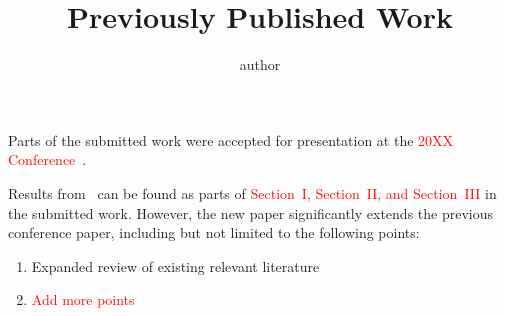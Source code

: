 \documentclass[letterpaper,DIV=11,english,parskip=half]{scrartcl}
\title{Previously Published Work}
\author{{{author}}}
\begin{document}
\maketitle

Parts of the submitted work were accepted for presentation at the \textcolor{red}{20XX Conference}~\cite{}.

Results from~\cite{} can be found as parts of \textcolor{red}{Section~I, Section~II, and Section~III} in the submitted work.
However, the new paper significantly extends the previous conference paper, including but not limited to the following points:
\begin{enumerate}
	\item Expanded review of existing relevant literature
	\item \textcolor{red}{Add more points}
\end{enumerate}

\printbibliography
\end{document}
